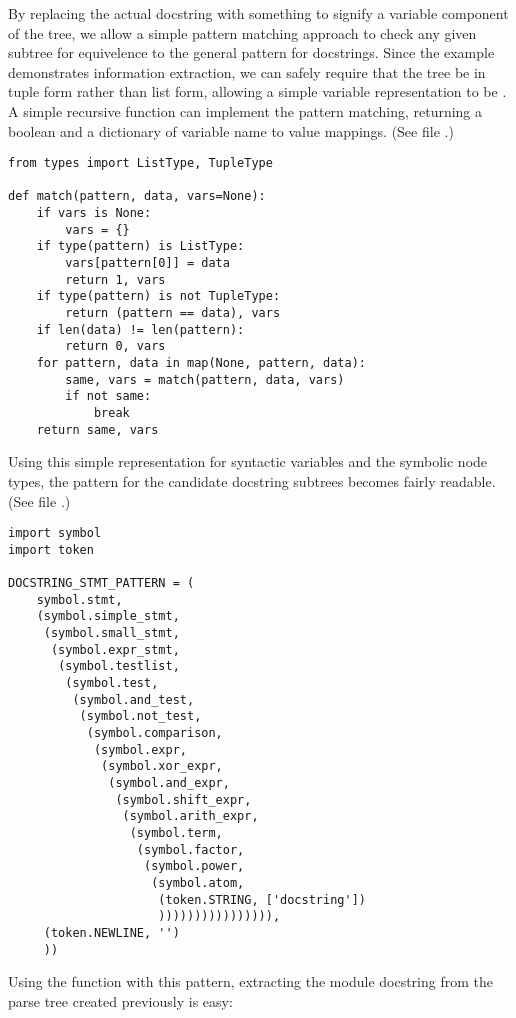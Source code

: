 By replacing the actual docstring with something to signify a variable
component of the tree, we allow a simple pattern matching approach to
check any given subtree for equivelence to the general pattern for
docstrings.  Since the example demonstrates information extraction, we
can safely require that the tree be in tuple form rather than list
form, allowing a simple variable representation to be
.  A simple recursive function can implement
the pattern matching, returning a boolean and a dictionary of variable
name to value mappings.  (See file .)

\begin{verbatim}
from types import ListType, TupleType

def match(pattern, data, vars=None):
    if vars is None:
        vars = {}
    if type(pattern) is ListType:
        vars[pattern[0]] = data
        return 1, vars
    if type(pattern) is not TupleType:
        return (pattern == data), vars
    if len(data) != len(pattern):
        return 0, vars
    for pattern, data in map(None, pattern, data):
        same, vars = match(pattern, data, vars)
        if not same:
            break
    return same, vars
\end{verbatim}

Using this simple representation for syntactic variables and the symbolic
node types, the pattern for the candidate docstring subtrees becomes
fairly readable.  (See file .)

\begin{verbatim}
import symbol
import token

DOCSTRING_STMT_PATTERN = (
    symbol.stmt,
    (symbol.simple_stmt,
     (symbol.small_stmt,
      (symbol.expr_stmt,
       (symbol.testlist,
        (symbol.test,
         (symbol.and_test,
          (symbol.not_test,
           (symbol.comparison,
            (symbol.expr,
             (symbol.xor_expr,
              (symbol.and_expr,
               (symbol.shift_expr,
                (symbol.arith_expr,
                 (symbol.term,
                  (symbol.factor,
                   (symbol.power,
                    (symbol.atom,
                     (token.STRING, ['docstring'])
                     )))))))))))))))),
     (token.NEWLINE, '')
     ))
\end{verbatim}

Using the  function with this pattern, extracting the
module docstring from the parse tree created previously is easy:

